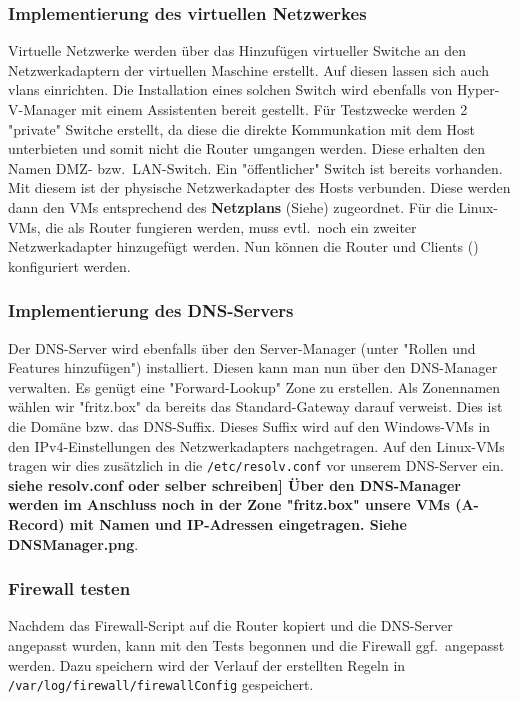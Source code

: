 \subsubsection{Implementierung des virtuellen Netzwerkes}
Virtuelle Netzwerke werden über das Hinzufügen virtueller Switche an den Netzwerkadaptern der virtuellen Maschine erstellt. Auf diesen lassen sich auch vlans einrichten.
Die Installation eines solchen Switch wird ebenfalls von Hyper-V-Manager mit einem Assistenten bereit gestellt. Für Testzwecke werden 2 "private" Switche erstellt, da diese die direkte Kommunkation mit dem Host unterbieten und somit nicht die Router umgangen werden. Diese erhalten den Namen DMZ- bzw.\ LAN-Switch. Ein "öffentlicher" Switch ist bereits vorhanden. Mit diesem ist der physische Netzwerkadapter des Hosts verbunden. Diese werden dann den VMs entsprechend des \textbf{Netzplans} (Siehe) zugeordnet. Für die Linux-VMs, die als Router fungieren werden, muss evtl.\ noch ein zweiter Netzwerkadapter hinzugefügt werden.
Nun können die Router und Clients () konfiguriert werden.

\subsubsection{Implementierung des DNS-Servers}
Der DNS-Server wird ebenfalls über den Server-Manager (unter "Rollen und Features hinzufügen") installiert. Diesen kann man nun über den DNS-Manager verwalten. Es genügt eine "Forward-Lookup" Zone zu erstellen. Als Zonennamen wählen wir "fritz.box" da bereits das Standard-Gateway darauf verweist. Dies ist die Domäne bzw. das DNS-Suffix. Dieses Suffix wird auf den Windows-VMs in den IPv4-Einstellungen des Netzwerkadapters nachgetragen. Auf den Linux-VMs tragen wir dies zusätzlich in die \verb+/etc/resolv.conf+ vor unserem DNS-Server ein. \textbf{siehe resolv.conf oder selber schreiben]
Über den DNS-Manager werden im Anschluss noch in der Zone "fritz.box" unsere VMs (A-Record) mit Namen und IP-Adressen eingetragen. \textbf Siehe DNSManager.png}.

\subsubsection{Firewall testen}
Nachdem das Firewall-Script auf die Router kopiert und die DNS-Server angepasst wurden, kann mit den Tests begonnen und die Firewall ggf.\ angepasst werden. Dazu speichern wird der Verlauf der erstellten Regeln in \verb+/var/log/firewall/firewallConfig+ gespeichert.

